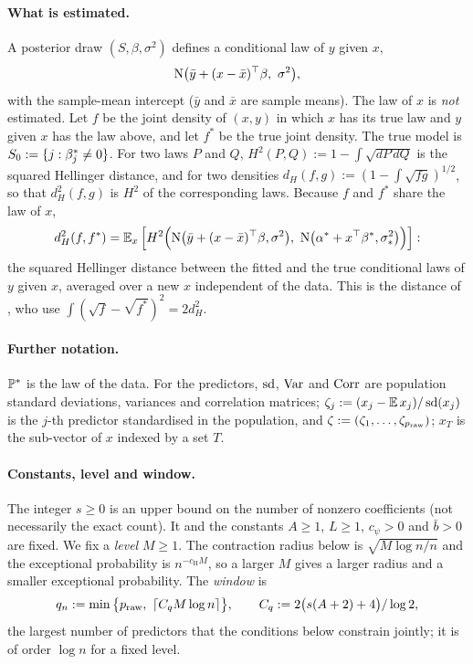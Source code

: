 \paragraph{What is estimated.} A posterior draw $(S,\beta,\sigma^2)$ defines a conditional law of $y$ given $x$,
\[
  \Normal\big(\bar y+(x-\bar x)^\top\beta,\ \sigma^2\big),
\]
with the sample-mean intercept ($\bar y$ and $\bar x$ are sample means). The law of $x$ is \emph{not} estimated. Let $f$
be the joint density of $(x,y)$ in which $x$ has its true law and $y$ given $x$ has the law above, and let $f^*$ be the
true joint density. The true model is $\Sz:=\{j:\beta^*_j\neq0\}$. For two laws $P$ and $Q$,
$H^2(P,Q):=1-\int\sqrt{dP\,dQ}$ is the squared Hellinger distance, and for
two densities $d_H(f,g):=(1-\int\sqrt{fg})^{1/2}$, so that $d_H^2(f,g)$ is $H^2$ of the corresponding laws. Because $f$ and $f^*$ share the law of $x$,
\begin{equation}\label{eq:dH}
  d_H^2(f,f^*)=\E_x\Big[H^2\Big(\Normal\big(\bar y+(x-\bar x)^\top\beta,\sigma^2\big),\
  \Normal\big(\alpha^*+x^\top\bstar,\sigs^2\big)\Big)\Big]:
\end{equation}
the squared Hellinger distance between the fitted and the true conditional laws of $y$ given $x$, averaged over a new $x$
independent of the data. This is the distance of \citet[Theorems~1--2]{SongLiang2015}, who use
$\int(\sqrt f-\sqrt{f^*})^2=2d_H^2$.

\paragraph{Further notation.} $\P^*$ is the law of the data. For the predictors, $\sd$, $\Var$ and $\Corr$ are population
standard deviations, variances and correlation matrices; $\zeta_j:=(x_j-\E x_j)/\sd(x_j)$ is the $j$-th predictor
standardised in the population, and $\zeta:=(\zeta_1,\dots,\zeta_{\praw})$; $x_T$ is the sub-vector of $x$ indexed by a
set $T$.

\paragraph{Constants, level and window.} The integer $s\ge0$ is an upper bound on the number of nonzero
coefficients (not necessarily the exact count). It and the constants $A\ge1$, $L\ge1$, $c_\psi>0$ and $\bar b>0$ are
fixed. We fix a \emph{level} $M\ge1$. The contraction radius below is $\sqrt{M\log n/n}$ and the exceptional
probability is $n^{-c_{\mathrm H}M}$, so a larger $M$ gives a larger radius and a smaller exceptional probability. The \emph{window} is
\[
  q_n:=\min\big\{\praw,\ \lceil C_qM\log n\rceil\big\},\qquad C_q:=2\big(s(A+2)+4\big)/\log2,
\]
the largest number of predictors that the conditions below constrain jointly; it is of order $\log n$ for a fixed level.

